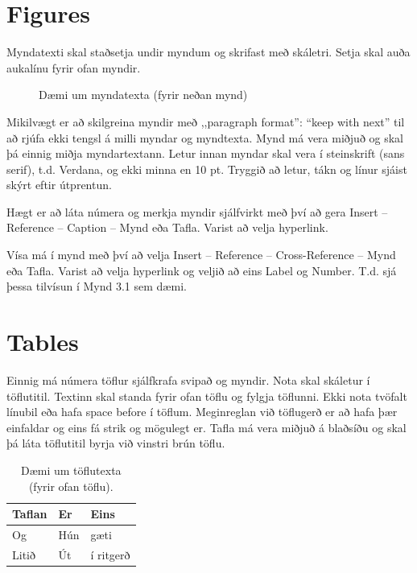 \documentclass[a4paper,12pt,twoside,BCOR=10mm]{scrbook}
\begin{document}
\section{Figures}
Myndatexti skal staðsetja undir myndum og skrifast með skáletri.
Setja skal auða aukalínu fyrir ofan myndir.
\begin{figure}[!htb]
\centering
\caption[Dæmi um myndatexta (fyrir neðan mynd).]{Dæmi um myndatexta (fyrir neðan mynd)} \label{fig:Array}
\end{figure}
Mikilvægt er að skilgreina myndir með ,,paragraph format”: “keep with next” til að rjúfa ekki tengsl á milli myndar og myndtexta. Mynd má vera miðjuð og skal þá einnig miðja myndartextann. Letur innan myndar skal vera í steinskrift (sans serif), t.d. Verdana, og ekki minna en 10 pt. Tryggið að letur, tákn og línur sjáist skýrt eftir útprentun.

Hægt er að láta númera og merkja myndir sjálfvirkt með því að gera Insert – Reference – Caption – Mynd eða Tafla. Varist að velja hyperlink. 

Vísa má í mynd með því að velja Insert – Reference – Cross-Reference – Mynd eða Tafla. Varist að velja hyperlink og veljið að eins Label og Number. T.d. sjá þessa tilvísun í Mynd 3.1 sem dæmi. 

\section{Tables}
Einnig má númera töflur sjálfkrafa svipað og myndir. Nota skal skáletur í töflutitil. Textinn skal standa fyrir ofan töflu og fylgja töflunni.  Ekki nota tvöfalt línubil eða hafa space before í töflum. Meginreglan við töflugerð er að hafa þær einfaldar og eins fá strik og mögulegt er. Tafla má vera miðjuð á blaðsíðu og skal þá láta töflutitil byrja við vinstri brún töflu.


\begin{table}[htb]
\centering
\caption{Dæmi um töflutexta (fyrir ofan töflu).}
     \sffamily \begin{tabularx}{1.0\textwidth}{ p{5cm}  p{5cm}  p{5cm} }
    \hline
   \textbf{Taflan} \hfill & \textbf{Er} \hfill & \textbf{Eins} \\ \hline
    Og & Hún & gæti\\
    Litið & Út & í ritgerð\\ \hline
    \end{tabularx} \normalfont
\label{table:Emissivity}
\end{table}
\end{document}
